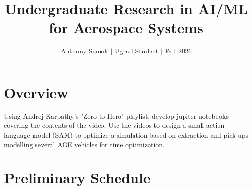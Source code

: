 \documentclass[letterpaper,11pt]{article}
\title{
 Undergraduate Research in
AI/ML for Aerospace Systems
}
\author{Anthony Semak $|$ Ugrad Student $|$ Fall 2026}
\begin{document}
\date{\vspace{-4ex}}

\maketitle
\vspace{2.5mm}

\section*{Overview}

Using Andrej Karpathy's "Zero to Hero" playlist, develop jupiter notebooks
covering the contents of the video. Use the videos to design a small
action language model (SAM) to optimize a simulation based on extraction
and pick ups modelling several AOE vehicles for time optimization.

\section*{Preliminary Schedule}
\end{document}

